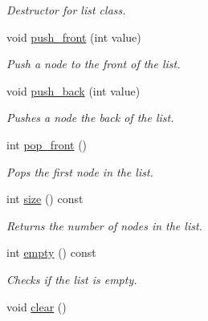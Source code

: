 \begin{DoxyCompactItemize}
\begin{DoxyCompactList}\small\item\em Destructor for list class. \end{DoxyCompactList}\item 
void \hyperlink{class_c_s170_1_1_list_aa4df5e17fcab71423695ff6be85714d4}{push\-\_\-front} (int value)
\begin{DoxyCompactList}\small\item\em Push a node to the front of the list. \end{DoxyCompactList}\item 
void \hyperlink{class_c_s170_1_1_list_aabda8988f5d8ba94dcf3b7ead4f0a601}{push\-\_\-back} (int value)
\begin{DoxyCompactList}\small\item\em Pushes a node the back of the list. \end{DoxyCompactList}\item 
int \hyperlink{class_c_s170_1_1_list_a8ff551128c175ece5bc4ef1b1d8651fc}{pop\-\_\-front} ()
\begin{DoxyCompactList}\small\item\em Pops the first node in the list. \end{DoxyCompactList}\item 
int \hyperlink{class_c_s170_1_1_list_ad1fff6513ecabae741f4a994f02c0743}{size} () const 
\begin{DoxyCompactList}\small\item\em Returns the number of nodes in the list. \end{DoxyCompactList}\item 
int \hyperlink{class_c_s170_1_1_list_ab3ca8534ee9519f46a5834e45e2176ea}{empty} () const 
\begin{DoxyCompactList}\small\item\em Checks if the list is empty. \end{DoxyCompactList}\item 
\hypertarget{class_c_s170_1_1_list_a3c855f1af11b27061da04658291d7330}{void \hyperlink{class_c_s170_1_1_list_a3c855f1af11b27061da04658291d7330}{clear} ()}\label{class_c_s170_1_1_list_a3c855f1af11b27061da04658291d7330}


\end{DoxyCompactItemize}
